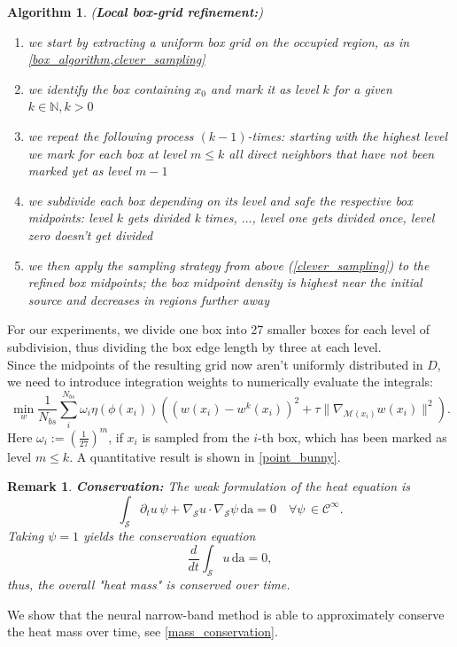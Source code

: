 \documentclass[draft,12pt,openany]{book}
\def\S{\mathcal{S}}
\theoremstyle{plainnormal}
\newtheorem{remark}[theorem]{Remark}
\newtheorem{algorithm}[theorem]{Algorithm}
\theoremstyle{remark}
\begin{document}
\begin{algorithm}(\textbf{Local box-grid refinement:})
    \begin{enumerate}
    \item we start by extracting a uniform box grid on the occupied region, as in \cref{box_algorithm,clever_sampling}
    \item we identify the box containing $x_0$ and mark it as level $k$ for a given $k\in \mathbb N, k > 0$
    \item  we repeat the following process $(k-1)$-times: starting with the highest level we mark for each box at level $m\leq k$ all direct neighbors that have not been marked yet as level $m-1$
    \item we subdivide each box depending on its level and safe the respective box midpoints: level $k$ gets divided k times, $\dots$,  level one gets divided once, level zero doesn't get divided 
    \item we then apply the sampling strategy from above (\cref{clever_sampling}) to the refined box midpoints; the box midpoint density is highest near the initial source and decreases in regions further away
    \end{enumerate} 
\end{algorithm}
For our experiments, we divide one box into 27 smaller boxes for each level of subdivision, thus dividing the box edge length by three at each level.\\
Since the midpoints of the resulting grid now aren't uniformly distributed in $D$, we need to introduce integration weights to numerically evaluate the integrals: 
\begin{equation*}
    \min_w \frac{1}{N_{bs}} \sum_i^{N_{bs}} \omega_i \eta(\phi(x_i)) \left((w(x_i) - w^k(x_i))^2 + \tau \|\nabla_{\mathcal{M}(x_i)} w(x_i)\|^2\right).
\end{equation*}
Here $\omega_i:= (\frac{1}{27})^m$, if $x_i$ is sampled from the $i$-th box, which has been marked as level $m\leq k$. A quantitative result is shown in \cref{point_bunny}.
\begin{remark}\textbf{Conservation:}
    The weak formulation of the heat equation is \[
        \int_\mathcal{S} \partial_t u \, \psi + \nabla_\mathcal{S} u \cdot \nabla_\mathcal{S} \psi \, \mathrm{da} = 0 \quad \forall \psi\,\in \mathcal C^\infty.
    \]
    Taking $\psi = 1$ yields the conservation equation
    $$\frac{d}{dt} \int_\S  u \,\mathrm{da} = 0,$$
    thus, the overall "heat mass" is conserved over time.
\end{remark}
 We show that the neural narrow-band method is able to approximately conserve the heat mass over time, see \cref{mass_conservation}.
\end{document}
